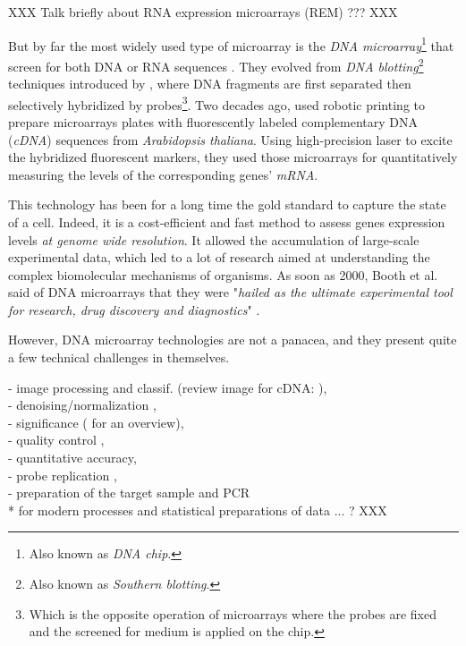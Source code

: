 	XXX Talk briefly about RNA expression microarrays (REM) ??? XXX

	But by far the most widely used type of microarray is the \emph{DNA microarray}\footnote{Also known as \emph{DNA chip}.} that screen for both DNA or RNA sequences \parencite{sealfon2011rna}.
	They evolved from \emph{DNA blotting}\footnote{Also known as \emph{Southern blotting}.} techniques introduced by \textcite{southern1975detection}, where DNA fragments are first separated then selectively hybridized by probes\footnote{Which is the opposite operation of microarrays where the probes are fixed and the screened for medium is applied on the chip.}.
	Two decades ago, \textcite{schena1995quantitative} used robotic printing to prepare microarrays plates with fluorescently labeled complementary DNA (\emph{cDNA}) sequences from \emph{Arabidopsis thaliana}.
	Using high-precision laser to excite the hybridized fluorescent markers, they used those microarrays for quantitatively measuring the levels of the corresponding genes' \emph{mRNA}.

	This technology has been for a long time the gold standard to capture the state of a cell.
	Indeed, it is a cost-efficient and fast method to assess genes expression levels \emph{at genome wide resolution}.
	It allowed the accumulation of large-scale experimental data, which led to a lot of research aimed at understanding the complex biomolecular mechanisms of organisms.
	As soon as 2000, Booth et al. said of DNA microarrays that they were "\emph{hailed as the ultimate experimental tool for research, drug discovery and diagnostics}" \parencite{booth2000application}.

	However, DNA microarray technologies are not a panacea, and they present quite a few technical challenges in themselves.

	- image processing and classif. (review image for cDNA: \parencite{karun2015review}),\\
	- denoising/normalization \parencite{kreil2005tutorial}, \\
	- significance (\parencite{steinhoff2006normalization} for an overview), \\
	- quality control \parencite{wang2001quantitative},\\
	- quantitative accuracy,\\
	- probe replication \parencites{black2002calculation}{smyth2005use},\\
	- preparation of the target sample and PCR \\
	* \textcite{maruyama2014gene} for modern processes and statistical preparations of data
	... ? XXX

